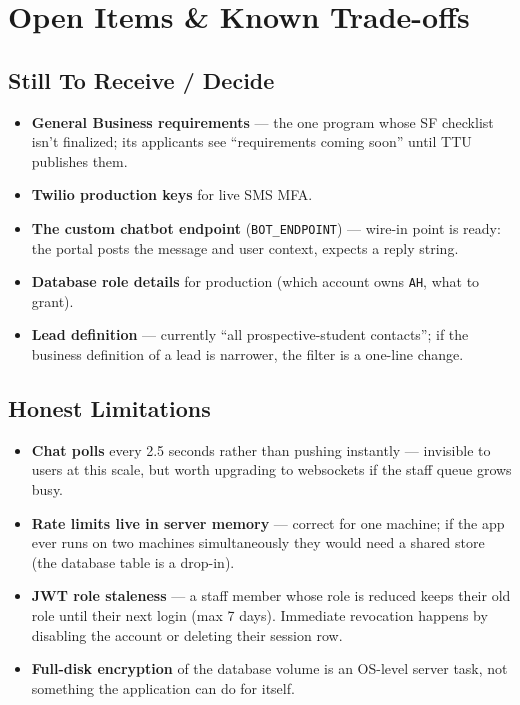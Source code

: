 \documentclass[11pt,letterpaper]{report}
\begin{document}
\chapter{Open Items \& Known Trade-offs}

\section{Still To Receive / Decide}

\begin{itemize}[leftmargin=1.4em]
  \item \textbf{General Business requirements} --- the one program whose SF
        checklist isn't finalized; its applicants see ``requirements coming
        soon'' until TTU publishes them.
  \item \textbf{Twilio production keys} for live SMS MFA.
  \item \textbf{The custom chatbot endpoint} (\texttt{BOT\_ENDPOINT}) ---
        wire-in point is ready: the portal posts the message and user context,
        expects a reply string.
  \item \textbf{Database role details} for production (which account owns
        \texttt{AH}, what to grant).
  \item \textbf{Lead definition} --- currently ``all prospective-student
        contacts''; if the business definition of a lead is narrower, the
        filter is a one-line change.
\end{itemize}

\section{Honest Limitations}

\begin{itemize}[leftmargin=1.4em]
  \item \textbf{Chat polls} every 2.5 seconds rather than pushing instantly ---
        invisible to users at this scale, but worth upgrading to websockets if
        the staff queue grows busy.
  \item \textbf{Rate limits live in server memory} --- correct for one machine;
        if the app ever runs on two machines simultaneously they would need a
        shared store (the database table is a drop-in).
  \item \textbf{JWT role staleness} --- a staff member whose role is reduced
        keeps their old role until their next login (max 7 days). Immediate
        revocation happens by disabling the account or deleting their session
        row.
  \item \textbf{Full-disk encryption} of the database volume is an
        OS-level server task, not something the application can do for itself.
\end{itemize}
\end{document}
